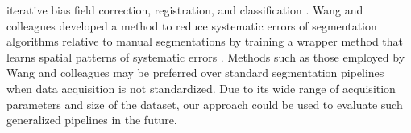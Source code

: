 iterative bias field correction, registration, and classification \cite{optimize}. Wang and colleagues developed a method to reduce systematic errors of segmentation algorithms relative to manual segmentations by training a wrapper method that learns spatial patterns of systematic errors \cite{Wang2011}. Methods such as those employed by Wang and colleagues may be preferred over standard segmentation pipelines when data acquisition is not standardized. Due to its wide range of acquisition parameters and size of the dataset, our approach could be used to evaluate such generalized pipelines in the future.